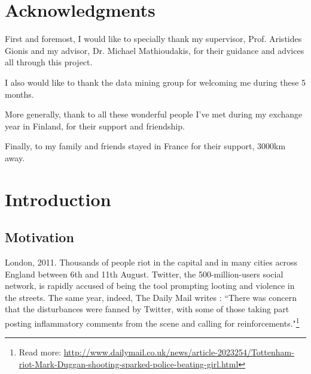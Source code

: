 \documentclass[a4paper,twoside,12pt,openright]{report}
\begin{document}
\chapter*{Acknowledgments}

First and foremost, I would like to specially thank my supervisor, Prof. Aristides Gionis and my advisor, Dr. Michael Mathioudakis, for their guidance and advices all through this project. 

I also would like to thank the data mining group for welcoming me during these 5 months.

More generally, thank to all these wonderful people I've met during my exchange year in Finland, for their support and friendship.

Finally, to my family and friends stayed in France for their support, 3000km away.



 



\restoregeometry

\chapter{Introduction}

\section{Motivation}
London, 2011. Thousands of people riot in the capital and in many cities across England between 6th and 11th August. Twitter, the 500-million-users social network, is rapidly accused of being the tool prompting looting and violence in the streets. The same year, indeed, The Daily Mail writes : ``There was concern that the disturbances were fanned by Twitter, with some of those taking part posting inflammatory comments from the scene and calling for reinforcements."\footnote{\noindent Read more: \url{http://www.dailymail.co.uk/news/article-2023254/Tottenham-riot-Mark-Duggan-shooting-sparked-police-beating-girl.html}}
\end{document}

